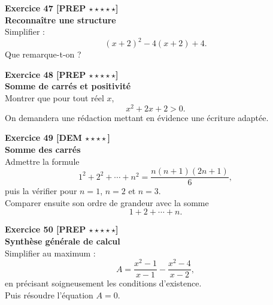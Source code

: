 \documentclass[11pt,a4paper]{article}
\begin{document}
\textbf{Exercice 47 [PREP $\star\star\star\star\star$]}\\
\textbf{Reconnaître une structure}\\
Simplifier :
\[
(x+2)^2-4(x+2)+4.
\]
Que remarque-t-on ?

\textbf{Exercice 48 [PREP $\star\star\star\star\star$]}\\
\textbf{Somme de carrés et positivité}\\
Montrer que pour tout réel $x$,
\[
x^2+2x+2>0.
\]
On demandera une rédaction mettant en évidence une écriture adaptée.

\textbf{Exercice 49 [DEM $\star\star\star\star$]}\\
\textbf{Somme des carrés}\\
Admettre la formule
\[
1^2+2^2+\cdots+n^2=\frac{n(n+1)(2n+1)}{6},
\]
puis la vérifier pour $n=1$, $n=2$ et $n=3$.\\
Comparer ensuite son ordre de grandeur avec la somme
\[
1+2+\cdots+n.
\]

\textbf{Exercice 50 [PREP $\star\star\star\star\star$]}\\
\textbf{Synthèse générale de calcul}\\
Simplifier au maximum :
\[
A=\frac{x^2-1}{x-1}-\frac{x^2-4}{x-2},
\]
en précisant soigneusement les conditions d’existence.\\
Puis résoudre l’équation $A=0$.
\end{document}
